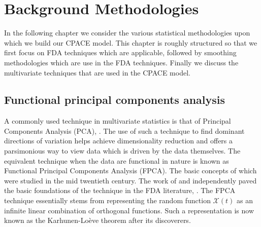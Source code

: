 
\chapter{Background Methodologies \label{cha:background}}  %


\ifpdf
    \graphicspath{{Chapter3/Figs/Raster/}{Chapter3/Figs/PDF/}{Chapter3/Figs/}}
\else
    \graphicspath{{Chapter3/Figs/Vector/}{Chapter3/Figs/}}
\fi

In the following chapter we consider the various statistical methodologies  upon which we build our CPACE model.
This chapter is roughly structured so that we first focus on FDA techniques which are applicable, followed by smoothing methodologies which are use in the FDA techniques. 
Finally we discuss the multivariate techniques that are used in the CPACE model. 

\section{Functional principal components analysis \label{sec:fpca}}
A commonly used technique in multivariate statistics is that of Principal Components Analysis (PCA), \citep{wold_principal_1987}. 
The use of such a technique to find dominant directions of variation helps achieve dimensionality reduction and offers a parsimonious way to view data which is driven by the data themselves.
The equivalent technique when the data are functional in nature is known as Functional Principal Components Analysis (FPCA).
The basic concepts of which were studied in the mid twentieth century.
The work of \citeauthor{karhunen_zur_1946} and independently \citeauthor{loeve_fonctions_1946} paved the basic foundations of the technique in the FDA literature, \citep{karhunen_zur_1946, loeve_fonctions_1946}.
The FPCA technique essentially stems from representing the random function $\mathcal{X}(t)$ as an infinite linear combination of orthogonal functions.
Such a representation is now known as the Karhunen-Lo\`{e}ve theorem after its discoverers.

